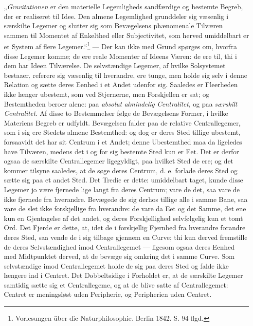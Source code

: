 \documentclass[12pt,a4paper]{book}
\begin{document}
„\emph{Gravitationen} er den materielle Legemligheds sandfærdige og bestemte
Begreb, der er realiseret til Idee. Den almene Legemlighed grunddeler sig
væsenlig i særskilte Legemer og slutter sig som Bevægelsens phænomenale
Tilværen sammen til Momentet af Enkelthed eller Subjectivitet, som herved
umiddelbart er et System af flere Legemer.“\footnote{%
Vorlesungen über die Naturphilosophie. Berlin 1842. S. 94 flgd.} --- Der kan
ikke med Grund spørges om, hvorfra disse Legemer komme; de ere reale Momenter
af Ideens Væren: de ere til, thi i dem har Ideen Tilværelse. De selvstændige
Legemer, af hvilke Solsystemet bestaaer, referere sig væsenlig til hverandre,
ere tunge, men holde sig selv i denne Relation og sætte deres Eenhed i et Andet
udenfor sig. Saaledes er Fleerheden ikke længer ubestemt, som ved Stjernerne,
men Forskjellen er sat; og Bestemtheden beroer alene: paa
\emph{absolut almindelig Centralitet}, og paa \emph{særskilt Centralitet}. Af
disse to Bestemmelser følge de Bevægelsens Former, i hvilke Materiens Begreb er
udfyldt. Bevægelsen falder paa de relative Centrallegemer, som i sig ere
Stedets almene Bestemthed: og dog er deres Sted tillige ubestemt, forsaavidt
det har sit Centrum i et Andet; denne Ubestemthed maa da ligeledes have
Tilværen, medens det i
og for sig bestemte Sted kun er Eet. Det er derfor ogsaa de særskilte
Centrallegemer ligegyldigt, paa hvilket Sted de ere; og det kommer tilsyne
saaledes, at de søge deres Centrum, d. e. forlade deres Sted og sætte sig paa
et andet Sted. Det Tredie er dette: umiddelbart taget, kunde disse Legemer jo
være fjernede lige langt fra deres Centrum; vare de det, saa vare de ikke
fjernede fra hverandre. Bevægede de sig derhos tillige alle i samme Bane, saa
vare de slet ikke forskjellige fra hverandre: de vare da Eet og det Samme, det
ene kun en Gjentagelse af det andet, og deres Forskjellighed selvfølgelig kun
et tomt Ord. Det Fjerde er dette, at, idet de i forskjellig Fjernhed fra
hverandre forandre deres Sted, saa vende de i sig tilbage gjennem en Curve; thi
kun derved fremstille de deres Selvstændighed imod Centrallegemet --- ligesom
ogsaa deres Eenhed med Midtpunktet derved, at de bevæge sig omkring det i samme
Curve. Som selvstændige imod Centrallegemet holde de sig paa deres Sted og
falde ikke længere ind i Centret. Det Dobbeltsidige i Forholdet er, at de
særskilte Legemer samtidig sætte sig et Centrallegeme, og at de blive satte af
Centrallegemet: Centret er meningsløst uden Peripherie, og Peripherien uden
Centret.
\end{document}
